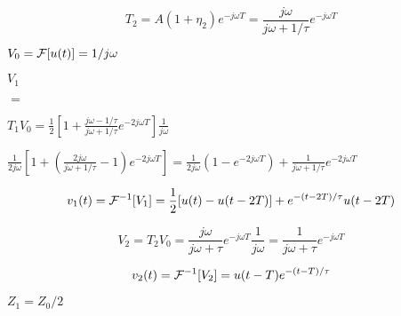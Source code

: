 {\newpage\clearpage
{}%
\begin{displaymath} T_2=A(1+\eta_2)e^{-j\omega T}=\frac{j\omega}{j\omega+1/\tau}e^{-j\omega T} \end{displaymath}%
\lthtmldisplayZ
\lthtmlcheckvsize\clearpage}

{\newpage\clearpage
{}%
$V_0={\cal F}[u(t)]=1/j\omega$%
\lthtmlinlinemathZ
\lthtmlcheckvsize\clearpage}

{\newpage\clearpage
{}%
$\displaystyle V_1$%
\lthtmlindisplaymathZ
\lthtmlcheckvsize\clearpage}

{\newpage\clearpage
{}%
$\textstyle =$%
\lthtmlindisplaymathZ
\lthtmlcheckvsize\clearpage}

{\newpage\clearpage
{}%
$\displaystyle T_1V_0
    =\frac{1}{2}\left[1+\frac{j\omega-1/\tau}{j\omega+1/\tau}e^{-2j\omega T}\right]\frac{1}{j\omega}$%
\lthtmlindisplaymathZ
\lthtmlcheckvsize\clearpage}

{\newpage\clearpage
{}%
$\displaystyle \frac{1}{2j\omega}\left[1+\left(\frac{2j\omega}{j\omega+1/\tau}-1\right)e^{-2j\omega T}\right]
    =\frac{1}{2j\omega}\left(1-e^{-2j\omega T}\right)+\frac{1}{j\omega+1/\tau}e^{-2j\omega T}$%
\lthtmlindisplaymathZ
\lthtmlcheckvsize\clearpage}

{\newpage\clearpage
{}%
\begin{displaymath}	v_1(t)={\cal F}^{-1}[V_1]=\frac{1}{2}[u(t)-u(t-2T)]+e^{-(t-2T)/\tau} u(t-2T) \end{displaymath}%
\lthtmldisplayZ
\lthtmlcheckvsize\clearpage}

{\newpage\clearpage
{}%
\begin{displaymath} 	V_2=T_2V_0=\frac{j\omega}{j\omega+\tau}e^{-j\omega T} \frac{1}{j\omega}
  =\frac{1}{j\omega+\tau}e^{-j\omega T} \end{displaymath}%
\lthtmldisplayZ
\lthtmlcheckvsize\clearpage}

{\newpage\clearpage
{}%
\begin{displaymath}	v_2(t)={\cal F}^{-1}[V_2]=u(t-T) e^{-(t-T)/\tau} 	\end{displaymath}%
\lthtmldisplayZ
\lthtmlcheckvsize\clearpage}

{\newpage\clearpage
{}%
$Z_1=Z_0/2$%
\lthtmlinlinemathZ
\lthtmlcheckvsize\clearpage}

